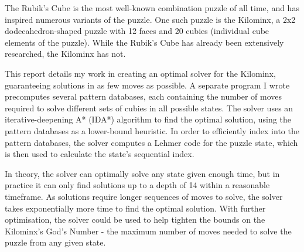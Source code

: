 The Rubik's Cube is the most well-known combination puzzle of all time, and has inspired numerous variants of the puzzle. One such puzzle is the Kilominx, a 2x2 dodecahedron-shaped puzzle with 12 faces and 20 cubies (individual cube elements of the puzzle). While the Rubik's Cube has already been extensively researched, the Kilominx has not.

This report details my work in creating an optimal solver for the Kilominx, guaranteeing solutions in as few moves as possible. A separate program I wrote precomputes several pattern databases, each containing the number of moves required to solve different sets of cubies in all possible states. The solver uses an iterative-deepening A* (IDA*) algorithm to find the optimal solution, using the pattern databases as a lower-bound heuristic. In order to efficiently index into the pattern databases, the solver computes a Lehmer code for the puzzle state, which is then used to calculate the state's sequential index.

In theory, the solver can optimally solve any state given enough time, but in practice it can only find solutions up to a depth of 14 within a reasonable timeframe. As solutions require longer sequences of moves to solve, the solver takes exponentially more time to find the optimal solution. With further optimisation, the solver could be used to help tighten the bounds on the Kilominx's God's Number - the maximum number of moves needed to solve the puzzle from any given state.